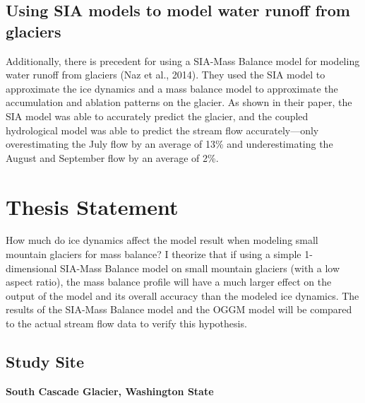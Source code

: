 \documentclass{article}
\begin{document}
\subsection{Using SIA models to model water runoff from glaciers}
    Additionally, there is precedent for using a SIA-Mass Balance model for modeling water runoff from glaciers (Naz et al., 2014). They used 
the SIA model to approximate the ice dynamics and a mass balance model to approximate the accumulation and ablation patterns on the glacier. 
As shown in their paper, the SIA model was able to accurately predict the glacier, and the coupled hydrological model was able to predict 
the stream flow accurately---only overestimating the July flow by an average of 13\% and underestimating the August and September flow by an 
average of 2\%.

\section{Thesis Statement}
How much do ice dynamics affect the model result when modeling small mountain glaciers for mass balance? I theorize that if using a simple 
1-dimensional SIA-Mass Balance model on small mountain glaciers (with a low aspect ratio), the mass balance profile will have a 
much larger effect on the output of the model and its overall accuracy than the modeled ice dynamics. The results of the SIA-Mass Balance 
model and the OGGM model will be compared to the actual stream flow data to verify this hypothesis.
\subsection{Study Site}
\textbf{\large South Cascade Glacier, Washington State}
\end{document}
